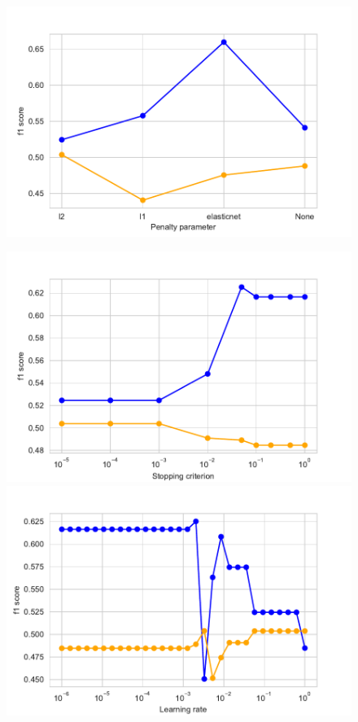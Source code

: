 \documentclass[11pt]{article}
\begin{document}
\begin{figure}[h]
\begin{minipage}[l]{0.33\textwidth}
\end{minipage}
\begin{minipage}[l]{0.33\textwidth}
\includegraphics[width=1\linewidth]{bridges/penalty_ppn.pdf}\\
\end{minipage}
\begin{minipage}[l]{0.33\textwidth}
\includegraphics[width=1\linewidth]{bridges/tol_ppn.pdf}
\end{minipage}
\begin{minipage}[l]{0.33\textwidth}
\includegraphics[width=1\linewidth]{bridges/learning_rate_ppn.pdf}

\end{minipage}
\end{figure}
\end{document}
